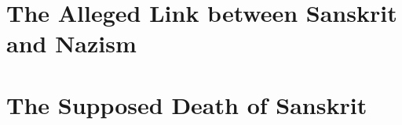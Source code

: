 \documentclass[10pt,twoside]{book}
\begin{document}
\frontmatter

\lhead[\small\thepage]{}
\rhead[]{\small\thepage}
\chead[]{}
\cfoot[]{}


\newpage


\newpage


\newpage


\newpage



\mainmatter

\chead[]{}
\cfoot[]{}


\part{The Alleged Link between Sanskrit and Nazism}







\part{The Supposed Death of Sanskrit}







\makeatletter
\renewcommand\thesubsubsection{\thesubsection.\@arabic\c@subsubsection}
\makeatother







\label{book:end}
\end{document}
